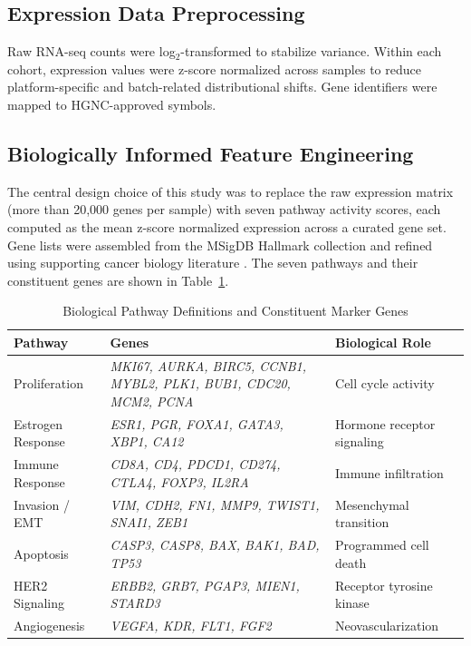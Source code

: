 \documentclass[11pt]{article}
\begin{document}
\subsection{Expression Data Preprocessing}

Raw RNA-seq counts were log$_2$-transformed to stabilize variance. Within each cohort, expression values were z-score normalized across samples to reduce platform-specific and batch-related distributional shifts. Gene identifiers were mapped to HGNC-approved symbols.

\subsection{Biologically Informed Feature Engineering}

The central design choice of this study was to replace the raw expression matrix (more than 20,000 genes per sample) with seven pathway activity scores, each computed as the mean z-score normalized expression across a curated gene set. Gene lists were assembled from the MSigDB Hallmark collection \citep{liberzon2015} and refined using supporting cancer biology literature \citep{hanahan2011}. The seven pathways and their constituent genes are shown in Table~\ref{tab:pathways}.

\begin{table}[H]
\centering
\caption{Biological Pathway Definitions and Constituent Marker Genes}
\label{tab:pathways}
\small
\begin{tabular}{p{3cm} p{7.5cm} p{3cm}}
\toprule
\textbf{Pathway} & \textbf{Genes} & \textbf{Biological Role} \\
\midrule
Proliferation & \textit{MKI67, AURKA, BIRC5, CCNB1, MYBL2, PLK1, BUB1, CDC20, MCM2, PCNA} & Cell cycle activity \\
Estrogen Response & \textit{ESR1, PGR, FOXA1, GATA3, XBP1, CA12} & Hormone receptor signaling \\
Immune Response & \textit{CD8A, CD4, PDCD1, CD274, CTLA4, FOXP3, IL2RA} & Immune infiltration \\
Invasion / EMT & \textit{VIM, CDH2, FN1, MMP9, TWIST1, SNAI1, ZEB1} & Mesenchymal transition \\
Apoptosis & \textit{CASP3, CASP8, BAX, BAK1, BAD, TP53} & Programmed cell death \\
HER2 Signaling & \textit{ERBB2, GRB7, PGAP3, MIEN1, STARD3} & Receptor tyrosine kinase \\
Angiogenesis & \textit{VEGFA, KDR, FLT1, FGF2} & Neovascularization \\
\bottomrule
\end{tabular}
\end{table}
\end{document}
